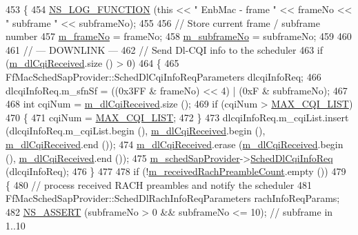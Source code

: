 \begin{DoxyCode}
453 \{
454   \hyperlink{log-macros-disabled_8h_a90b90d5bad1f39cb1b64923ea94c0761}{NS\_LOG\_FUNCTION} (\textcolor{keyword}{this} << \textcolor{stringliteral}{" EnbMac - frame "} << frameNo << \textcolor{stringliteral}{" subframe "} << subframeNo);
455 
456   \textcolor{comment}{// Store current frame / subframe number}
457   \hyperlink{classns3_1_1LteEnbMac_a1ca20e5d0d321f28dc931bdcccadfada}{m\_frameNo} = frameNo;
458   \hyperlink{classns3_1_1LteEnbMac_adccfd57ac8aedd1182963517546fde38}{m\_subframeNo} = subframeNo;
459 
460 
461   \textcolor{comment}{// --- DOWNLINK ---}
462   \textcolor{comment}{// Send Dl-CQI info to the scheduler}
463   \textcolor{keywordflow}{if} (\hyperlink{classns3_1_1LteEnbMac_a363959b047048eb81f1f49a90530ff83}{m\_dlCqiReceived}.size () > 0)
464     \{
465       FfMacSchedSapProvider::SchedDlCqiInfoReqParameters dlcqiInfoReq;
466       dlcqiInfoReq.m\_sfnSf = ((0x3FF & frameNo) << 4) | (0xF & subframeNo);
467 
468       \textcolor{keywordtype}{int} cqiNum = \hyperlink{classns3_1_1LteEnbMac_a363959b047048eb81f1f49a90530ff83}{m\_dlCqiReceived}.size ();
469       \textcolor{keywordflow}{if} (cqiNum > \hyperlink{ff-mac-common_8h_a1628e4e53813eb25bbff39d5b76aeef4}{MAX\_CQI\_LIST})
470         \{
471           cqiNum = \hyperlink{ff-mac-common_8h_a1628e4e53813eb25bbff39d5b76aeef4}{MAX\_CQI\_LIST};
472         \}
473       dlcqiInfoReq.m\_cqiList.insert (dlcqiInfoReq.m\_cqiList.begin (), 
      \hyperlink{classns3_1_1LteEnbMac_a363959b047048eb81f1f49a90530ff83}{m\_dlCqiReceived}.begin (), \hyperlink{classns3_1_1LteEnbMac_a363959b047048eb81f1f49a90530ff83}{m\_dlCqiReceived}.end ());
474       \hyperlink{classns3_1_1LteEnbMac_a363959b047048eb81f1f49a90530ff83}{m\_dlCqiReceived}.erase (\hyperlink{classns3_1_1LteEnbMac_a363959b047048eb81f1f49a90530ff83}{m\_dlCqiReceived}.begin (), 
      \hyperlink{classns3_1_1LteEnbMac_a363959b047048eb81f1f49a90530ff83}{m\_dlCqiReceived}.end ());
475       \hyperlink{classns3_1_1LteEnbMac_a48a4fe366fd18025fb8ebe4a3de2a143}{m\_schedSapProvider}->\hyperlink{classns3_1_1FfMacSchedSapProvider_afd94faa752236ee832abdb53f937411b}{SchedDlCqiInfoReq} (dlcqiInfoReq);
476     \}
477 
478   \textcolor{keywordflow}{if} (!\hyperlink{classns3_1_1LteEnbMac_a3f2ae0439200f19f8e046510579494a0}{m\_receivedRachPreambleCount}.empty ())
479     \{
480       \textcolor{comment}{// process received RACH preambles and notify the scheduler}
481       FfMacSchedSapProvider::SchedDlRachInfoReqParameters rachInfoReqParams;
482       \hyperlink{assert_8h_a6dccdb0de9b252f60088ce281c49d052}{NS\_ASSERT} (subframeNo > 0 && subframeNo <= 10); \textcolor{comment}{// subframe in 1..10}

\end{DoxyCode}
